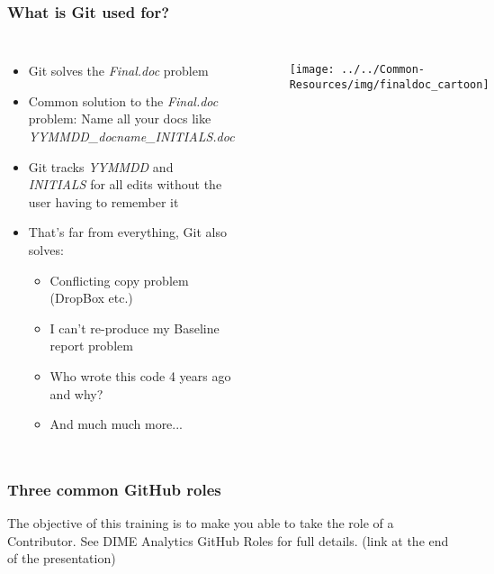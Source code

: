 \documentclass[aspectratio=169]{beamer} %
\begin{document}
\begin{frame}
\frametitle{What is Git used for?}

	\begin{columns}[c]

		\begin{itemize}
			\item Git solves the \textit{Final.doc} problem
			\item <2->Common solution to the \textit{Final.doc} problem: Name all your docs like \textit{YYMMDD\_docname\_INITIALS.doc}
			\item <3->Git tracks \textit{YYMMDD} and \textit{INITIALS} for all edits  without the user having to remember it
			\item <4->That's far from everything, Git also solves:
			\begin{itemize}
				\item <4->Conflicting copy problem (DropBox etc.)
				\item <4->I can't re-produce my Baseline report problem
				\item <4->Who wrote this code 4 years ago and why?
				\item <4->And much much more...
			\end{itemize}
		\end{itemize}

		\begin{figure}
			\centering
			\texttt{[image: ../../Common-Resources/img/finaldoc\_cartoon]}
			\label{fig:finaldoccartoon}
		\end{figure}

	\end{columns}
\end{frame}



\begin{frame}
	\frametitle{Three common GitHub roles}
	
	\small The objective of this training is to make you able to take the role of a Contributor. See DIME Analytics GitHub Roles for full details. (link at the end of the presentation)
	
	
	
\end{frame}
\end{document}
